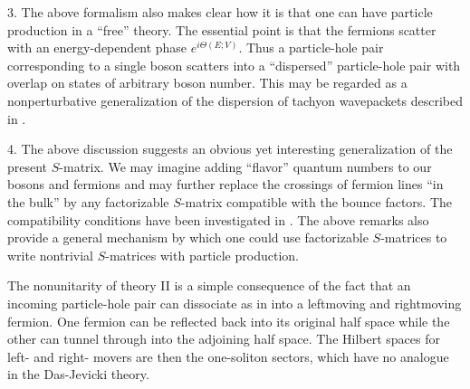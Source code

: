 3. The above formalism also makes clear how 
it is that one can have particle 
production in a ``free'' theory. The essential point is 
that the fermions scatter with an 
energy-dependent phase $e^{i \Theta(E;V)}$. 
Thus a particle-hole pair corresponding to 
a single boson scatters into a ``dispersed'' 
particle-hole pair with overlap on states of arbitrary 
boson number. This may be regarded as a nonperturbative 
generalization of the dispersion of tachyon 
wavepackets described in \joefluid.
  
4. The above discussion suggests an obvious yet interesting
generalization of the present $S$-matrix. We may imagine
adding ``flavor'' quantum numbers to our bosons and fermions
and may further replace the crossings of fermion lines
``in the bulk'' by any factorizable $S$-matrix  compatible
with the bounce factors. The compatibility conditions 
have been investigated in
\nref{}%
\nref{}%
. 
The above remarks also provide a general 
mechanism by which one could use factorizable $S$-matrices
to write nontrivial $S$-matrices with particle production.
  
 
The nonunitarity of theory II is a simple consequence of 
the fact that an incoming particle-hole pair can dissociate
as in
\fig{} into a leftmoving and
rightmoving fermion. One fermion can be reflected back into its
original half space while the other can
tunnel through into the adjoining half space. 
The Hilbert spaces for left-      
and right- movers are then the one-soliton sectors, which have
no analogue in the Das-Jevicki theory.%
 
